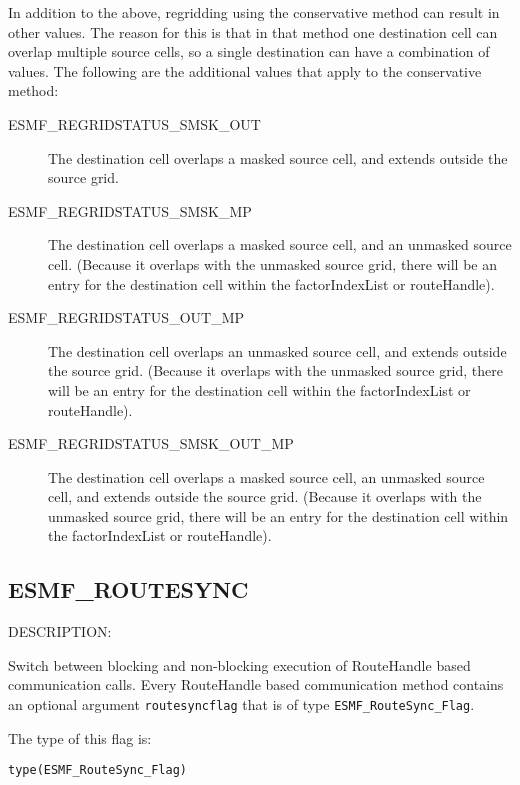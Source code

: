 In addition to the above, regridding using the conservative method can result in other values. The reason for this is that in that method one destination cell can overlap multiple source cells, so a single destination can have a combination of values.  
The following are the additional values that apply to the conservative method:
\begin{description}
\item [ESMF\_REGRIDSTATUS\_SMSK\_OUT] The destination cell overlaps a masked source cell, and extends outside the source grid. 
\item [ESMF\_REGRIDSTATUS\_SMSK\_MP] The destination cell overlaps a masked source cell, and an unmasked source cell. (Because it overlaps with the unmasked source grid, there will be an entry for the destination cell within the factorIndexList or routeHandle).  
\item [ESMF\_REGRIDSTATUS\_OUT\_MP] The destination cell overlaps an unmasked source cell, and extends outside the source grid.  (Because it overlaps with the unmasked source grid, there will be an entry for the destination cell within the factorIndexList or routeHandle). 
\item [ESMF\_REGRIDSTATUS\_SMSK\_OUT\_MP] The destination cell overlaps a masked source cell, an unmasked source cell, and extends outside the source grid. (Because it overlaps with the unmasked source grid, there will be an entry for the destination cell within the factorIndexList or routeHandle).  
\end{description}


\subsection{ESMF\_ROUTESYNC}
\label{const:routesync}
{\sf DESCRIPTION:\\}  
\begin{sloppypar}
Switch between blocking and non-blocking execution of RouteHandle based
communication calls. Every RouteHandle based communication method contains
an optional argument {\tt routesyncflag} that is of type {\tt ESMF\_RouteSync\_Flag}.
\end{sloppypar}

The type of this flag is:

{\tt type(ESMF\_RouteSync\_Flag)}

